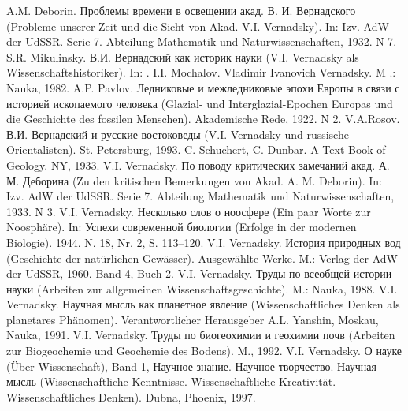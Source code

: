 \documentclass[11pt,a4paper]{article}
\begin{document}
\begin{thebibliography}{xxx}
 A.M. Deborin. \foreignlanguage{russian}{Проблемы времени
  в освещении акад. В. И. Вернадского} (Probleme unserer Zeit und die Sicht
  von Akad. V.I. Vernadsky). In: Izv. AdW der UdSSR. Serie 7.  Abteilung
  Mathematik und Naturwissenschaften, 1932. N 7.
 S.R. Mikulinsky.
  \foreignlanguage{russian}{В.И. Вернадский как историк науки} (V.I. Vernadsky
  als Wissenschaftshistoriker). In: \cite{Vernadsky1988}.
 I.I. Mochalov. Vladimir Ivanovich Vernadsky. M .:
  Nauka, 1982. 
 A.P. Pavlov. \foreignlanguage{russian}{Ледниковые и
  межледниковые эпохи Европы в связи с историей ископаемого человека}
  (Glazial- und Interglazial-Epochen Europas und die Geschichte des fossilen
  Menschen). Akademische Rede, 1922. N 2.
 V.A.Rosov. \foreignlanguage{russian}{В.И. Вернадский и
  русские востоковеды} (V.I. Vernadsky und russische Orientalisten).
  St. Petersburg, 1993.
 C. Schuchert, C. Dunbar. A Text Book of Geology.  NY,
  1933.
 V.I. Vernadsky. \foreignlanguage{russian}{По поводу
  критических замечаний акад. А. М. Деборина} (Zu den kritischen Bemerkungen
  von Akad. A. M. Deborin). In: Izv. AdW der UdSSR.  Serie 7. Abteilung
  Mathematik und Naturwissenschaften, 1933. N 3.
 V.I. Vernadsky. \foreignlanguage{russian}{Несколько
  слов о ноосфере} (Ein paar Worte zur Noosphäre). In:
  \foreignlanguage{russian}{Успехи современной биологии} (Erfolge in der
  modernen Biologie). 1944. N. 18, Nr. 2, S. 113--120.
  V.I. Vernadsky. \foreignlanguage{russian}{История
  природных вод} (Geschichte der natürlichen Gewässer).  Ausgewählte Werke.
  M.: Verlag der AdW der UdSSR, 1960. Band 4, Buch 2.
 V.I. Vernadsky. \foreignlanguage{russian}{Труды по
  всеобщей истории науки} (Arbeiten zur allgemeinen Wissenschaftsgeschichte).
  M.: Nauka, 1988.
 V.I. Vernadsky. \foreignlanguage{russian}{Научная
  мысль как планетное явление} (Wissenschaftliches Denken als planetares
  Phänomen).  Verantwortlicher Herausgeber A.L. Yanshin, Moskau, Nauka, 1991.
 V.I. Vernadsky. \foreignlanguage{russian}{Труды по
  биогеохимии и геохимии почв} (Arbeiten zur Biogeochemie und Geochemie des
  Bodens). M., 1992.
 V.I. Vernadsky. \foreignlanguage{russian}{О науке}
  (Über Wissenschaft), Band 1, \foreignlanguage{russian}{Научное знание.
  Научное творчество. Научная мысль} (Wissenschaftliche Kenntnisse.
  Wissenschaftliche Kreativität. Wissenschaftliches Denken).  Dubna, Phoenix,
  1997.
\end{thebibliography}
\end{document}
